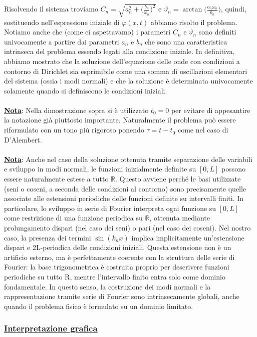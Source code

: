 \documentclass[a4paper,12pt]{report}
\begin{document}
Risolvendo il sistema troviamo $C_n=\displaystyle\sqrt{a_n^2+\bigg(\frac{b_n}{\omega_n}\bigg)^2}$ e $\vartheta_n=\arctan\bigg(\frac{a_n\omega_n}{b_n}\bigg)$, quindi, sostituendo nell'espressione iniziale di $\varphi(x,t)$ abbiamo risolto il problema. Notiamo anche che (come ci aspettavamo) i parametri $C_n$ e $\vartheta_n$ sono definiti univocamente a partire dai parametri $a_n$ e $b_n$ che sono una caratteristica intrinseca del problema essendo legati alla condizione iniziale. In definitiva, abbiamo mostrato che la soluzione dell'equazione delle onde con condizioni a contorno di Dirichlet sia esprimibile come una somma di oscillazioni elementari del sistema (ossia i modi normali) e che la soluzione è determinata univocamente solamente quando si definiscono le condizioni iniziali.
\\
\\\underline{\textbf{Nota}}: Nella dimostrazione sopra si è utilizzato $t_0=0$ per evitare di appesantire la notazione già piuttosto importante. Naturalmente il problema può essere riformulato con un tono più rigoroso ponendo $\tau=t-t_0$ come nel caso di D'Alembert.
\\
\\\underline{\textbf{Nota}}: Anche nel caso della soluzione ottenuta tramite separazione delle variabili e sviluppo in modi normali, le funzioni inizialmente definite su $[0,L]$ possono essere naturalmente estese a tutto $\mathbb{R}$. Questo avviene perché le basi utilizzate (seni o coseni, a seconda delle condizioni al contorno) sono precisamente quelle associate alle estensioni periodiche delle funzioni definite su intervalli finiti. In particolare, lo sviluppo in serie di Fourier interpreta ogni funzione su $[0,L]$ come restrizione di una funzione periodica su $\mathbb{R}$, ottenuta mediante prolungamento dispari (nel caso dei seni) o pari (nel caso dei coseni). Nel nostro caso, la presenza dei termini $\sin(k_nx)$ implica implicitamente un’estensione dispari e 2L-periodica delle condizioni iniziali. Questa estensione non è un artificio esterno, ma è perfettamente coerente con la struttura delle serie di Fourier: la base trigonometrica è costruita proprio per descrivere funzioni periodiche su tutto R, mentre l’intervallo finito entra solo come dominio fondamentale. In questo senso, la costruzione dei modi normali e la rappresentazione tramite serie di Fourier sono intrinsecamente globali, anche quando il problema fisico è formulato su un dominio limitato.

\newpage

\subsubsection{\underline{Interpretazione grafica}}
\end{document}
